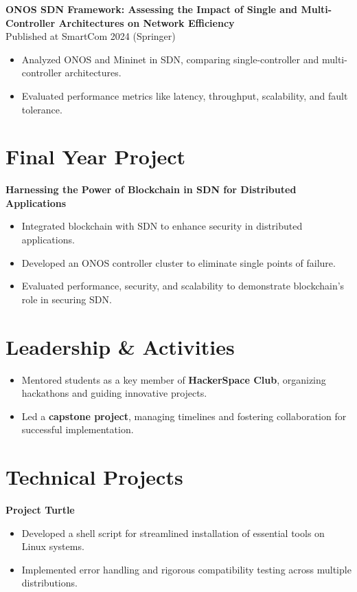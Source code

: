 \documentclass[a4paper,10pt]{article}
\begin{document}
\textbf{ONOS SDN Framework: Assessing the Impact of Single and Multi-Controller Architectures on Network Efficiency}\\
Published at SmartCom 2024 (Springer)
\begin{itemize}
    \item Analyzed ONOS and Mininet in SDN, comparing single-controller and multi-controller architectures.
    \item Evaluated performance metrics like latency, throughput, scalability, and fault tolerance.
\end{itemize}

\section*{Final Year Project}
\textbf{Harnessing the Power of Blockchain in SDN for Distributed Applications}
\begin{itemize}
    \item Integrated blockchain with SDN to enhance security in distributed applications.
    \item Developed an ONOS controller cluster to eliminate single points of failure.
    \item Evaluated performance, security, and scalability to demonstrate blockchain’s role in securing SDN.
\end{itemize}

\section*{Leadership \& Activities}
\begin{itemize}
    \item Mentored students as a key member of \textbf{HackerSpace Club}, organizing hackathons and guiding innovative projects.
    \item Led a \textbf{capstone project}, managing timelines and fostering collaboration for successful implementation.
\end{itemize}

\section*{Technical Projects}
\textbf{Project Turtle}
\begin{itemize}
    \item Developed a shell script for streamlined installation of essential tools on Linux systems.
    \item Implemented error handling and rigorous compatibility testing across multiple distributions.
\end{itemize}
\end{document}
